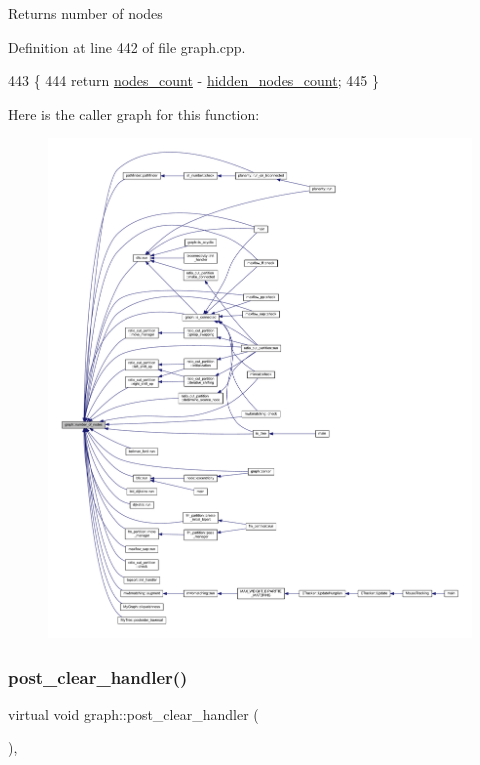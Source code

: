 \begin{DoxyReturn}{Returns}
number of nodes 
\end{DoxyReturn}


Definition at line 442 of file graph.\+cpp.


\begin{DoxyCode}
443 \{
444     \textcolor{keywordflow}{return} \mbox{\hyperlink{classgraph_a1f59223d0bcf647920963d7a661dd74a}{nodes\_count}} - \mbox{\hyperlink{classgraph_aa72548d972d226a69f7f8fb92b363860}{hidden\_nodes\_count}};
445 \}
\end{DoxyCode}
Here is the caller graph for this function\+:
\nopagebreak
\begin{figure}[H]
\begin{center}
\leavevmode
\includegraphics[width=350pt]{classgraph_a42c78e0a9f115655e3ff0efe35ebfc4e_icgraph}
\end{center}
\end{figure}
\mbox{\label{classgraph_a870633528590b7925cd27776bdd2bbd2}} 
\subsubsection{\texorpdfstring{post\+\_\+clear\+\_\+handler()}{post\_clear\_handler()}}
{\footnotesize\ttfamily virtual void graph\+::post\+\_\+clear\+\_\+handler (\begin{DoxyParamCaption}{ }\end{DoxyParamCaption})\hspace{0.3cm}{\ttfamily [inline]}, {\ttfamily [virtual]}}

